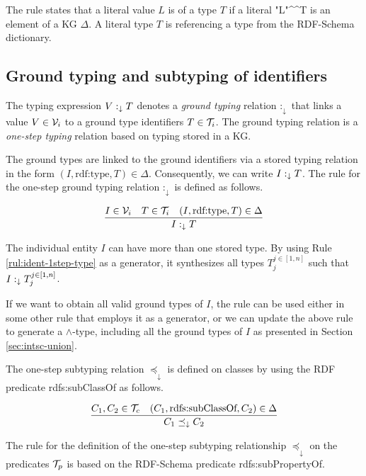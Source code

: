 \documentclass[runningheads]{llncs}
\newcommand{\darr}{\downarrow}
\newcommand{\V}{{\cal V}}
\newcommand{\T}{{\cal T}}
\begin{document}
The rule states that a literal value $L$ is of a type $T$ if a literal
"L"\textasciicircum\textasciicircum\/T is an element of a KG
$\Delta$. A literal type $T$ is referencing a type from the RDF-Schema
dictionary.






\subsection{Ground typing and subtyping of identifiers\label{sec:idents-stored}}

The typing expression $V:_\darr\/T$ denotes a \emph{ground typing}
relation $:_\darr$ that links a value $V\in\V_i$ to a ground type
identifiers $T\in\T_i$. The ground typing relation is a \emph{one-step
  typing} relation based on typing stored in a KG.

The ground types are linked to the ground identifiers via a stored
typing relation in the form
$(I,\text{rdf:type},T)\in\Delta$. Consequently, we can write
$I:_\darr\/T$. The rule for the one-step ground typing relation
$:_\darr$ is defined as follows.

\begin{equation}
\label{rul:ident-1step-type}
\dfrac{I\in\V_i\quad T\in\T_i\quad (I,\text{rdf:type},T)\in\D}
      {I :_\darr T}
\end{equation}

The individual entity $I$ can have more than one stored type. By
using Rule \ref{rul:ident-1step-type} as a generator, it synthesizes
all types $T_j^{j\in[1,n]}$ such that $I:_\darr\/T_j^{j\in[1,n]}$.

If we want to obtain all valid ground types of $I$, the rule can be
used either in some other rule that employs it as a generator, or we
can update the above rule to generate a $\land$-type, including all
the ground types of $I$ as presented in Section \ref{sec:intsc-union}.

The one-step subtyping relation $\preceq_\darr$ is defined on
classes by using the RDF predicate rdfs:sub\-ClassOf as follows.

\begin{equation}
\label{rul:ident-1step-subtype}
\dfrac{C_1,C_2\in\T_c\quad (C_1,\text{rdfs:subClassOf},C_2)\in\D}
{C_1 \preceq_\darr\/C_2}
\end{equation}

The rule for the definition of the one-step subtyping relationship
$\preceq_\darr$ on the predicates $\T_p$ is based on the RDF-Schema
predicate rdfs:subPropertyOf.
\end{document}
